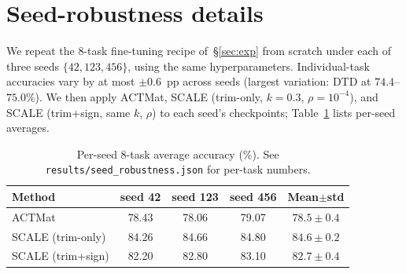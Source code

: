 \documentclass{article} %
\begin{document}
\section{Seed-robustness details}
\label{app:seed}

We repeat the 8-task fine-tuning recipe of~\S\ref{sec:exp} from scratch under each of three seeds $\{42, 123, 456\}$, using the same hyperparameters. Individual-task accuracies vary by at most $\pm 0.6$~pp across seeds (largest variation: DTD at $74.4$--$75.0\%$). We then apply ACTMat, SCALE (trim-only, $k{=}0.3$, $\rho{=}10^{-4}$), and SCALE (trim+sign, same $k$, $\rho$) to each seed's checkpoints; Table~\ref{tab:seed_appendix} lists per-seed averages.

\begin{table}[h]
\centering
\caption{Per-seed 8-task average accuracy (\%). See \texttt{results/seed\_robustness.json} for per-task numbers.}
\label{tab:seed_appendix}
\footnotesize
\begin{tabular}{lcccc}
\toprule
Method & seed 42 & seed 123 & seed 456 & Mean$\pm$std \\
\midrule
ACTMat              & 78.43 & 78.06 & 79.07 & $78.5{\pm}0.4$ \\
SCALE (trim-only)   & 84.26 & 84.66 & 84.80 & $84.6{\pm}0.2$ \\
SCALE (trim+sign)   & 82.20 & 82.80 & 83.10 & $82.7{\pm}0.4$ \\
\bottomrule
\end{tabular}
\end{table}
\end{document}
